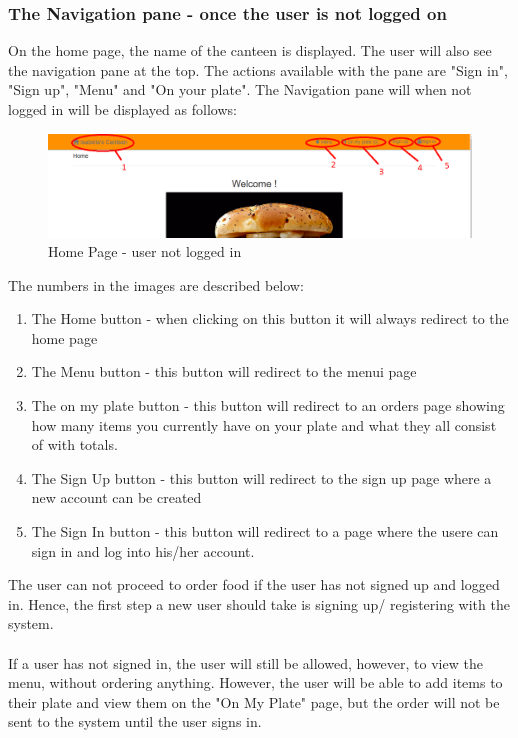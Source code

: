 \documentclass[a4paper,12pt]{article}
\begin{document}
\subsubsection{The Navigation pane - once the user is not  logged on}
On the home page, the name of the canteen is displayed. The user will also see the navigation pane at the top. The actions available with the pane are "Sign in", "Sign up", "Menu" and "On your plate". 
The Navigation pane will when not logged in will be displayed as follows:

\begin{figure}[H]
  \centering
    \includegraphics[width=1.0\textwidth]{screenshots/HomePage.png}
    \caption{Home Page - user not logged in } 
\end{figure}

The numbers in the images are described below:

\begin{enumerate}
\item The Home button - when clicking on this button it will always redirect to the home page
\item The Menu button - this button will redirect to the menui page
\item The on my plate button - this button will redirect to an orders page showing how many items you currently have on your plate and what they all consist of with totals.
\item The Sign Up button - this button will redirect to the sign up page where a new account can be created
\item The Sign In button - this button will redirect to a page where the usere can sign in and log into his/her account.
\end{enumerate}

The user can not proceed to order food if the user has not signed up and logged in. Hence, the first step a new user should take is signing up/ registering with the system. 
\\ \\
If a user has not signed in, the user will still be allowed, however, to view the menu, without ordering anything. However, the user will be able to add items to their plate and view them on the "On My Plate" page, but the order will not be sent to the system until the user signs in.
\end{document}
